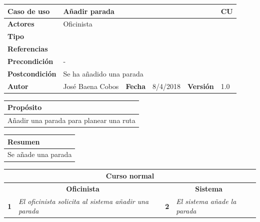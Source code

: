 \documentclass[12pt,spanish]{article}
\begin{document}
\begin{table}[H]
	\centering
	\begin{tabular}{|m{3cm}|m{4cm}|m{2cm}|m{2cm}|m{2cm}|m{1cm}|}
		\hline
		\textbf{Caso de uso} &  \multicolumn{4}{m{11cm}|}{Añadir parada} \vline &  \cellcolor{gray!40}CU\arabic{contadorCU}  \stepcounter{contadorCU} \\
		\hline
		\textbf{Actores} & \multicolumn{5}{m{11cm}|}{Oficinista} \\
		\hline
		\textbf{Tipo} & \multicolumn{5}{m{11cm}|}{} \\
		\hline
		\textbf{Referencias} &\multicolumn{5}{m{11cm}|}{} \\
		\hline
		\textbf{Precondición} & \multicolumn{5}{m{11cm}|}{-} \\
		\hline
		\textbf{Postcondición} & \multicolumn{5}{m{11cm}|}{Se ha añadido una parada} \\
		\hline
		\textbf{Autor} & José Baena Cobos & \textbf{Fecha} & 8/4/2018 & \textbf{Versión} & 1.0 \\
		\hline
	\end{tabular}
	
	\vspace{1cm}
	
	\begin{tabular}{|m{16.2cm}|}
		\hline
		\textbf{Propósito} \\
		\hline
		Añadir una parada para planear una ruta\\
		\hline
	\end{tabular}
	
	\vspace{1cm}
	
	\begin{tabular}{|m{16.2cm}|}
		\hline
		\textbf{Resumen} \\
		\hline
		Se añade una parada\\
		\hline
	\end{tabular}
	
	\vspace{1cm}
	
	\begin{tabular}{|m{5pt}|m{7.33cm}|m{5pt}|m{7.33cm}|}
		\hline
		\multicolumn{4}{|c|}{\textbf{Curso normal}} \\
		\hline
		\multicolumn{2}{|c}{\textbf{Oficinista}} & \multicolumn{2}{|c|}{\textbf{Sistema}} \\
		\hline
		\textbf{1} & \textit{El oficinista solicita al sistema añadir una parada} & \textbf{2} & \textit{El sistema añade la parada} \\
		\hline
	

\end{tabular}
\end{table}
\end{document}
